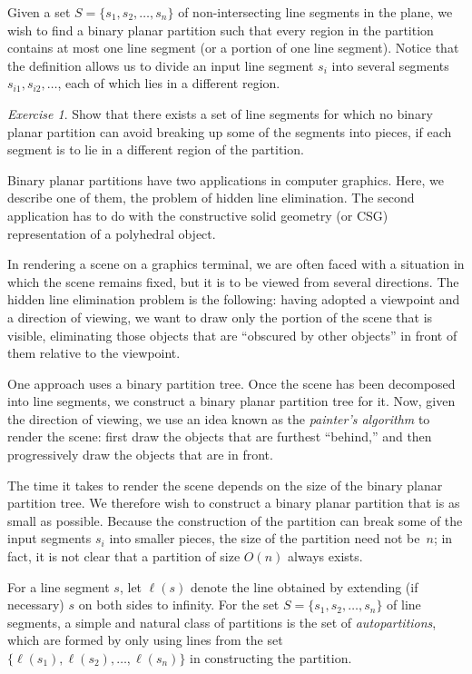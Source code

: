 \documentclass[twoside,12pt]{book}
\theoremstyle{plain}
\theoremstyle{definition}
\theoremstyle{remark}
\newtheorem{exercise}[theorem]{Exercise}
\begin{document}
Given a set $S=\{s_1,s_2,\ldots,s_n\}$ of non-intersecting line segments
in the plane, we wish to find a binary planar partition such that every
region in the partition contains at most one line segment (or a portion of
one line segment).  Notice that the definition allows us to divide an input
line segment $s_i$ into several segments $s_{i1},s_{i2},\ldots$, each of
which lies in a different region.

\begin{exercise}
Show that there exists a set of line segments for which no binary planar
partition can avoid breaking up some of the segments into pieces, if each
segment is to lie in a different region of the partition.
\end{exercise}

Binary planar partitions have two applications in computer graphics.  Here,
we describe one of them, the problem of hidden line elimination.  The second
application has to do with the constructive solid geometry (or CSG)
representation of a polyhedral object.

In rendering a scene on a graphics terminal, we are often faced with a
situation in which the scene remains fixed, but it is to be viewed from
several directions.  The hidden line elimination problem is the following:
having adopted a viewpoint and a direction of viewing, we want to draw only
the portion of the scene that is visible, eliminating those objects that are
``obscured by other objects'' in front of them relative to the viewpoint.

One approach uses a binary partition tree.  Once the scene has been decomposed
into line segments, we construct a binary planar partition tree for it.  Now,
given the direction of viewing, we use an idea known as the \emph{painter's
algorithm} to render the scene: first draw the objects that are furthest
``behind,'' and then progressively draw the objects that are in front.

The time it takes to render the scene depends on the size of the binary
planar partition tree.  We therefore wish to construct a binary planar
partition that is as small as possible.  Because the construction of the
partition can break some of the input segments $s_i$ into smaller pieces, the
size of the partition need not be~$n$; in fact, it is not clear that a
partition of size $O(n)$ always exists.

For a line segment $s$, let $\ell(s)$ denote the line obtained by extending
(if necessary) $s$ on both sides to infinity.  For the set
$S=\{s_1,s_2,\ldots,s_n\}$ of line segments, a simple and natural class of
partitions is the set of \emph{autopartitions}, which are formed by only
using lines from the set $\{\ell(s_1),\ell(s_2),\ldots,\ell(s_n)\}$ in
constructing the partition.
\end{document}
